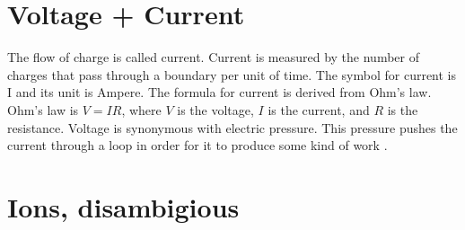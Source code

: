 \documentclass[../../Orator]{subfiles}
\begin{document}
 \section{Voltage + Current}
The flow of charge is called current. Current is measured by the number of charges that pass through a boundary per unit of time. The symbol for current is I and its unit is Ampere. The formula for current is derived from Ohm's law. Ohm's law is \(V=IR\), where \(V\) is the voltage, \(I\) is the current, and \(R\) is the resistance. Voltage is synonymous with electric pressure. This pressure pushes the current through a loop in order for it to produce some kind of work \cite{}. 


\section{Ions, disambigious}


\end{document}
